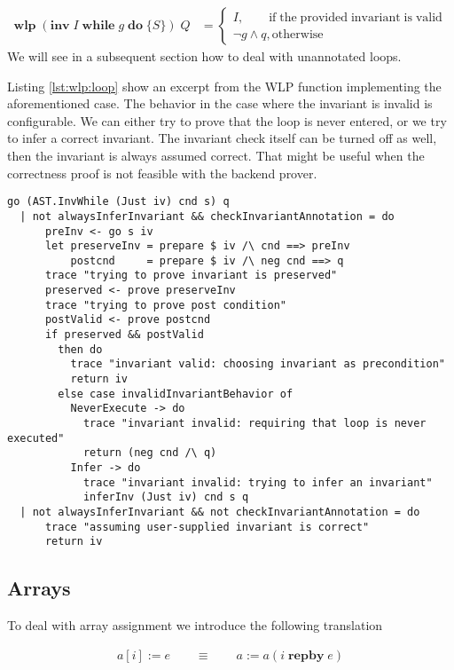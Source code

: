 \documentclass[]{scrartcl}
\newcommand{\IWHILE}[3]{\ensuremath{\mathbf{inv}\;#1\;\mathbf{while}\;#2\;\mathbf{do}\;\{#3\}}}
\newcommand{\WLP}[2]{\ensuremath{\mathbf{wlp}\;#1\;#2}}
\newcommand{\REPBY}[2]{\ensuremath{#1\;\mathbf{repby}\;#2}}
\begin{document}
\begin{align}
  \WLP{(\IWHILE{I}{g}{S})}{Q} &=
    \begin{cases}
      I, \qquad  \mathrm{if \; the \; provided \; invariant \; is \; valid}\\
      \neg g \land q, \mathrm{otherwise}
    \end{cases}
\end{align}
We will see in a subsequent section how to deal with unannotated loops.

Listing \ref{lst:wlp:loop} show an excerpt from the WLP function implementing the aforementioned case.
The behavior in the case where the invariant is invalid is configurable. We can either try to prove
that the loop is never entered, or we try to infer a correct invariant.
The invariant check itself can be turned off as well, then the invariant is always assumed correct.
That might be useful when the correctness proof is not feasible with the backend prover.

\begin{lstlisting}[caption=WLP loop case, label=lst:wlp:loop]
go (AST.InvWhile (Just iv) cnd s) q
  | not alwaysInferInvariant && checkInvariantAnnotation = do
      preInv <- go s iv
      let preserveInv = prepare $ iv /\ cnd ==> preInv
          postcnd     = prepare $ iv /\ neg cnd ==> q  
      trace "trying to prove invariant is preserved"
      preserved <- prove preserveInv
      trace "trying to prove post condition"
      postValid <- prove postcnd
      if preserved && postValid
        then do
          trace "invariant valid: choosing invariant as precondition"
          return iv
        else case invalidInvariantBehavior of
          NeverExecute -> do
            trace "invariant invalid: requiring that loop is never executed"
            return (neg cnd /\ q)
          Infer -> do
            trace "invariant invalid: trying to infer an invariant"
            inferInv (Just iv) cnd s q
  | not alwaysInferInvariant && not checkInvariantAnnotation = do
      trace "assuming user-supplied invariant is correct"
      return iv
\end{lstlisting}


\subsection{Arrays}
To deal with array assignment we introduce the following translation

\begin{align}
  a[i] := e \qquad \equiv \qquad a := a ( \REPBY{i}{e} )
\end{align}
\end{document}
